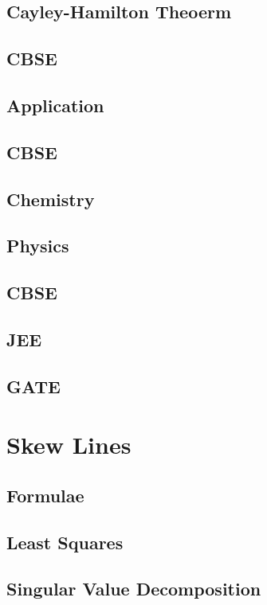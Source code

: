 \documentclass[journal]{IEEEtran}
\begin{document}
\subsection{Cayley-Hamilton Theoerm}

\subsection{CBSE}

\subsection{Application}

\subsection{CBSE}

\subsection{Chemistry}

\subsection{Physics}

\subsection{CBSE}

\subsection{JEE}

\subsection{GATE}

\newpage
\section{Skew Lines}
\subsection{Formulae}

\subsection{Least Squares}

\subsection{Singular Value Decomposition}

\end{document}
